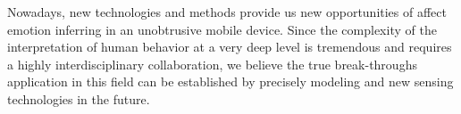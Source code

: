 Nowadays, new technologies and methods provide us new opportunities of affect emotion inferring in an unobtrusive mobile device. Since the complexity of the interpretation of human behavior at a very deep level is tremendous and requires a highly interdisciplinary collaboration, we believe the true break-throughs application in this field can be established by precisely modeling and new sensing technologies in the future.